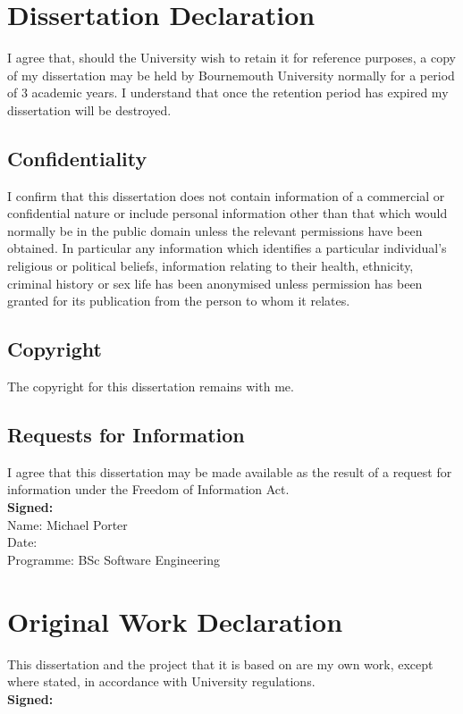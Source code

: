 \documentclass[11pt, twoside]{report}
\begin{document}
\chapter*{Dissertation Declaration}
{\linespread{1.0} %
I agree that, should the University wish to retain it for reference purposes, a copy of my dissertation may be held by Bournemouth University normally for a period of 3 academic years. I understand that once the retention period has expired my dissertation will be destroyed.

\section*{Confidentiality}
I confirm that this dissertation does not contain information of a commercial or confidential nature or include personal information other than that which would normally be in the public domain unless the relevant permissions have been obtained. In particular any information which identifies a particular individual's religious or political beliefs, information relating to their health, ethnicity, criminal history or sex life has been anonymised unless permission has been granted for its publication from the person to whom it relates.

\section*{Copyright}
The copyright for this dissertation remains with me.
 
\section*{Requests for Information}
I agree that this dissertation may be made available as the result of a request for information under the Freedom of Information Act.
\\ \newline
\textbf{Signed:}
\\
Name: Michael Porter
\\
Date:
\\
Programme: BSc Software Engineering
}

\chapter*{Original Work Declaration}

This dissertation and the project that it is based on are my own work, except where stated, in accordance with University regulations.
\\ \newline
\textbf{Signed:}
\end{document}

